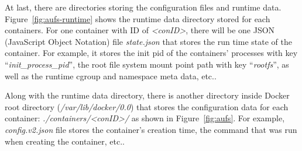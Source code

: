 At last, there are directories storing the configuration files and runtime data. Figure~\ref{fig:aufs-runtime} shows the runtime data directory stored for each containers. For one container with ID of \textit{<conID>}, there will be one JSON (JavaScript Object Notation)  file \textit{state.json} that stores the run time state of the container. For example, it stores the init pid of the containers' processes with key ``\textit{init\_process\_pid}'', the root file system mount point path with key ``\textit{rootfs}'', as well as the runtime cgroup and namespace meta data, etc.. 

Along with the runtime data directory, there is another directory inside Docker root directory (\textit{/var/lib/docker/0.0}) that stores the configuration data for each container: \textit{./containers/<conID>/} as shown in Figure~\ref{fig:aufs}. For example, \textit{ config.v2.json} file stores the container's creation time, the command that was run when creating the container, etc..



